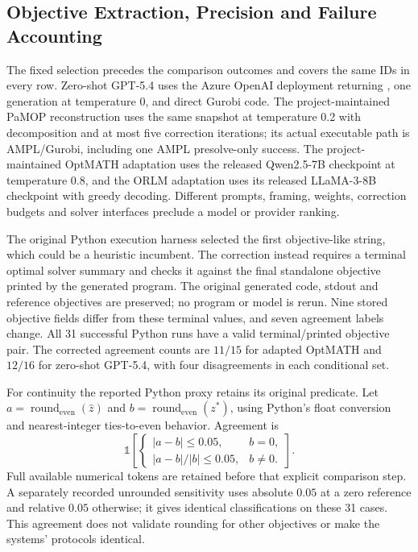 \documentclass[pdflatex,sn-basic,Numbered]{sn-jnl}
\begin{document}
\subsection{Objective Extraction, Precision and Failure Accounting}
The fixed selection precedes the comparison outcomes and covers the same IDs in every row. Zero-shot GPT-5.4 uses the Azure OpenAI deployment returning , one generation at temperature 0, and direct Gurobi code. The project-maintained PaMOP reconstruction uses the same snapshot at temperature 0.2 with decomposition and at most five correction iterations; its actual executable path is AMPL/Gurobi, including one AMPL presolve-only success. The project-maintained OptMATH adaptation uses the released Qwen2.5-7B checkpoint at temperature 0.8, and the ORLM adaptation uses its released LLaMA-3-8B checkpoint with greedy decoding. Different prompts, framing, weights, correction budgets and solver interfaces preclude a model or provider ranking.

The original Python execution harness selected the first objective-like string, which could be a heuristic incumbent. The correction instead requires a terminal optimal solver summary and checks it against the final standalone objective printed by the generated program. The original generated code, stdout and reference objectives are preserved; no program or model is rerun. Nine stored objective fields differ from these terminal values, and seven agreement labels change. All 31 successful Python runs have a valid terminal/printed objective pair. The corrected agreement counts are $11/15$ for adapted OptMATH and $12/16$ for zero-shot GPT-5.4, with four disagreements in each conditional set.

For continuity the reported Python proxy retains its original predicate. Let $a=\operatorname{round}_{\mathrm{even}}(\hat z)$ and $b=\operatorname{round}_{\mathrm{even}}(z^*)$, using Python's float conversion and nearest-integer ties-to-even behavior. Agreement is
\begin{equation}
 \mathbb{1}\!\left[\begin{cases}|a-b|\leq0.05,&b=0,\\ |a-b|/|b|\leq0.05,&b\ne0.\end{cases}\right].
 \label{eq:common18-objective-proxy}
\end{equation}
Full available numerical tokens are retained before that explicit comparison step. A separately recorded unrounded sensitivity uses absolute $0.05$ at a zero reference and relative $0.05$ otherwise; it gives identical classifications on these 31 cases. This agreement does not validate rounding for other objectives or make the systems' protocols identical.
\end{document}
